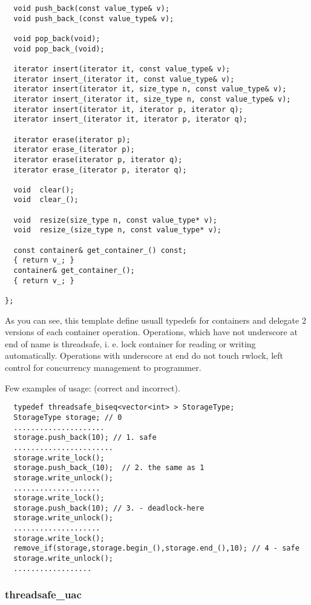 \documentclass[10pt]{article}
\begin{document}
\begin{verbatim}
  void push_back(const value_type& v);
  void push_back_(const value_type& v);

  void pop_back(void);
  void pop_back_(void);

  iterator insert(iterator it, const value_type& v);
  iterator insert_(iterator it, const value_type& v);
  iterator insert(iterator it, size_type n, const value_type& v);
  iterator insert_(iterator it, size_type n, const value_type& v);
  iterator insert(iterator it, iterator p, iterator q);
  iterator insert_(iterator it, iterator p, iterator q);

  iterator erase(iterator p);
  iterator erase_(iterator p);
  iterator erase(iterator p, iterator q);
  iterator erase_(iterator p, iterator q);
  
  void  clear();
  void  clear_();

  void  resize(size_type n, const value_type* v);
  void  resize_(size_type n, const value_type* v);

  const container& get_container_() const;
  { return v_; }
  container& get_container_();
  { return v_; }

};
\end{verbatim}

 As you can see, this template define usuall typedefs for containers and
delegate 2 versions of each container operation. 
 Operations, which have not underscore
at end of name is threadsafe, i. e. lock container for reading or 
writing automatically.
Operations with underscore at end do not touch rwlock, left control for
concurrency management to programmer.

 Few examples of usage: (correct and incorrect).

\begin{verbatim}
  typedef threadsafe_biseq<vector<int> > StorageType;
  StorageType storage; // 0
  .....................
  storage.push_back(10); // 1. safe
  .......................
  storage.write_lock();
  storage.push_back_(10);  // 2. the same as 1
  storage.write_unlock();
  ....................
  storage.write_lock();
  storage.push_back(10); // 3. - deadlock-here
  storage.write_unlock();
  ....................
  storage.write_lock();
  remove_if(storage,storage.begin_(),storage.end_(),10); // 4 - safe
  storage.write_unlock();
  ..................
\end{verbatim}

\subsubsection{ threadsafe\_uac }
 
\end{document}
